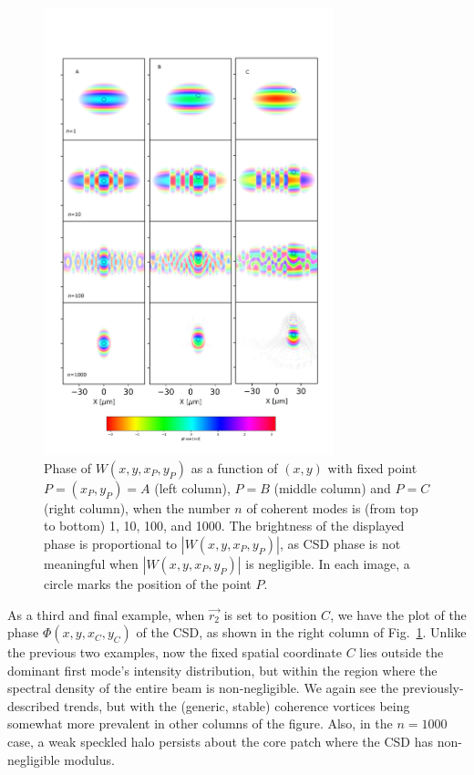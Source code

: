\documentclass[%
 reprint,
 amsmath,amssymb,
 aps,
]{revtex4-1}
\begin{document}
\begin{figure}
\includegraphics[width=0.75\textwidth]{Figures/vx_id16a_ABC.png}
\caption{Phase of $W(x,y,x_P,y_P)$ as a function of $(x,y)$ with fixed point $P=(x_P,y_P)=A$ (left column), $P=B$ (middle column) and $P=C$ (right column), when the number $n$ of coherent modes is (from top to bottom) 1, 10, 100, and 1000. The brightness of the displayed phase is proportional to $|W(x,y,x_P,y_P)|$, as CSD phase is not meaningful when $|W(x,y,x_P,y_P)|$ is negligible. In each image, a circle marks the position of the point $P$.}
\label{pointP}%
\end{figure}

As a third and final example, when $\vec{r_2}$ is set to position $C$, we have the plot of the phase $\Phi(x,y,x_C,y_C)$ of the CSD, as shown in the right column of Fig.~\ref{pointP}.  Unlike the previous two examples, now the fixed spatial coordinate $C$ lies outside the dominant first mode's intensity distribution, but within the region where the spectral density of the entire beam is non-negligible.  We again see the previously-described trends, but with the (generic, stable) coherence vortices being somewhat more prevalent in other columns of the figure.  Also, in the $n=1000$ case, a weak speckled halo persists about the core patch where the CSD has non-negligible modulus.    
\end{document}
